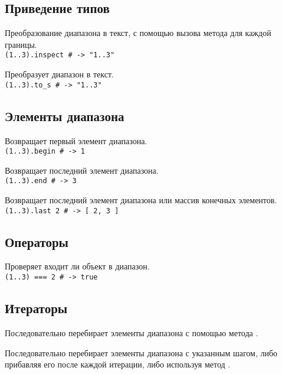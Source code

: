 \subsection*{Приведение типов} 

\begin{methodlist}
  Преобразование диапазона в текст, с помощью вызова метода  для каждой границы. 
  \\\verb!(1..3).inspect # -> "1..3"!
 
  Преобразует диапазон в текст. 
  \\\verb!(1..3).to_s # -> "1..3"!
\end{methodlist}

\subsection*{Элементы диапазона}

\begin{methodlist}
  Возвращает первый элемент диапазона. 
  \\\verb!(1..3).begin # -> 1!
 
  Возвращает последний элемент диапазона. 
  \\\verb!(1..3).end # -> 3!
 
  Возвращает последний элемент диапазона или массив конечных элементов. 
  \\\verb!(1..3).last 2 # -> [ 2, 3 ]!
\end{methodlist}
  
\subsection*{Операторы}

\begin{methodlist}
  Проверяет входит ли объект в диапазон.
  \\\verb!(1..3) === 2 # -> true!
\end{methodlist}

\subsection*{Итераторы}

\begin{methodlist}
  Последовательно перебирает элементы диапазона с помощью метода . 
 
  Последовательно перебирает элементы диапазона с указанным шагом, либо прибавляя его после каждой итерации, либо используя метод .
\end{methodlist} 

